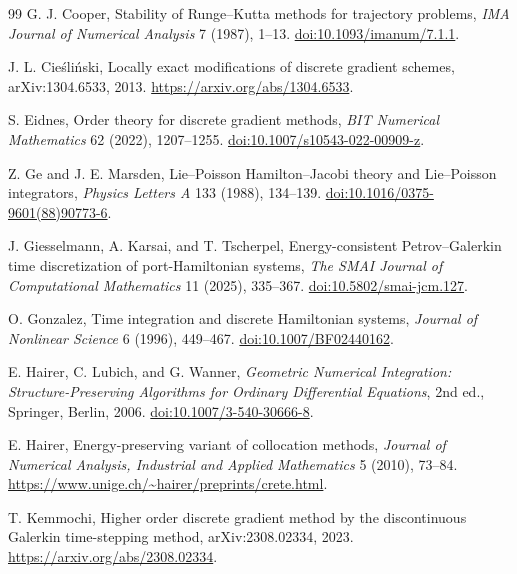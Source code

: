 \documentclass[11pt,a4paper]{article}
\begin{document}
\begin{thebibliography}{99}
G. J. Cooper,
\newblock Stability of Runge--Kutta methods for trajectory problems,
\newblock \emph{IMA Journal of Numerical Analysis} 7 (1987), 1--13.
\newblock \href{https://doi.org/10.1093/imanum/7.1.1}
{doi:10.1093/imanum/7.1.1}.

J. L. Cie{\'s}li{\'n}ski,
\newblock Locally exact modifications of discrete gradient schemes,
\newblock arXiv:1304.6533, 2013.
\newblock \url{https://arxiv.org/abs/1304.6533}.

S. Eidnes,
\newblock Order theory for discrete gradient methods,
\newblock \emph{BIT Numerical Mathematics} 62 (2022), 1207--1255.
\newblock \href{https://doi.org/10.1007/s10543-022-00909-z}
{doi:10.1007/s10543-022-00909-z}.

Z. Ge and J. E. Marsden,
\newblock Lie--Poisson Hamilton--Jacobi theory and Lie--Poisson integrators,
\newblock \emph{Physics Letters A} 133 (1988), 134--139.
\newblock \href{https://doi.org/10.1016/0375-9601(88)90773-6}
{doi:10.1016/0375-9601(88)90773-6}.

J. Giesselmann, A. Karsai, and T. Tscherpel,
\newblock Energy-consistent Petrov--Galerkin time discretization of
port-Hamiltonian systems,
\newblock \emph{The SMAI Journal of Computational Mathematics}
11 (2025), 335--367.
\newblock \href{https://doi.org/10.5802/smai-jcm.127}
{doi:10.5802/smai-jcm.127}.

O. Gonzalez,
\newblock Time integration and discrete Hamiltonian systems,
\newblock \emph{Journal of Nonlinear Science} 6 (1996), 449--467.
\newblock \href{https://doi.org/10.1007/BF02440162}
{doi:10.1007/BF02440162}.

E. Hairer, C. Lubich, and G. Wanner,
\newblock \emph{Geometric Numerical Integration: Structure-Preserving
Algorithms for Ordinary Differential Equations}, 2nd ed.,
\newblock Springer, Berlin, 2006.
\newblock \href{https://doi.org/10.1007/3-540-30666-8}
{doi:10.1007/3-540-30666-8}.

E. Hairer,
\newblock Energy-preserving variant of collocation methods,
\newblock \emph{Journal of Numerical Analysis, Industrial and Applied
Mathematics} 5 (2010), 73--84.
\newblock \url{https://www.unige.ch/~hairer/preprints/crete.html}.

T. Kemmochi,
\newblock Higher order discrete gradient method by the discontinuous
Galerkin time-stepping method,
\newblock arXiv:2308.02334, 2023.
\newblock \url{https://arxiv.org/abs/2308.02334}.


\end{thebibliography}
\end{document}
